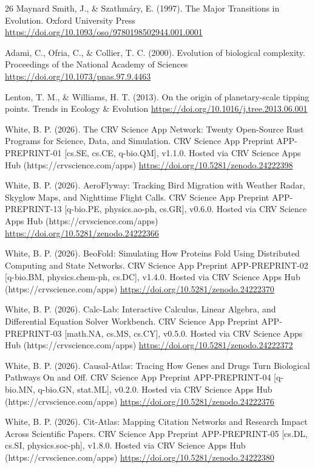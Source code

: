 \documentclass[10pt,letterpaper]{article}
\begin{document}
\begin{thebibliography}{26}
 Maynard Smith, J., \& Szathmáry, E. (1997). The Major Transitions in Evolution. Oxford University Press \url{https://doi.org/10.1093/oso/9780198502944.001.0001}

 Adami, C., Ofria, C., \& Collier, T. C. (2000). Evolution of biological complexity. Proceedings of the National Academy of Sciences \url{https://doi.org/10.1073/pnas.97.9.4463}

 Lenton, T. M., \& Williams, H. T. (2013). On the origin of planetary-scale tipping points. Trends in Ecology \& Evolution \url{https://doi.org/10.1016/j.tree.2013.06.001}

 White, B. P. (2026). The CRV Science App Network: Twenty Open-Source Rust Programs for Science, Data, and Simulation. CRV Science App Preprint APP-PREPRINT-01 [cs.SE, cs.CE, q-bio.QM], v1.1.0. Hosted via CRV Science Apps Hub (https://crvscience.com/apps) \url{https://doi.org/10.5281/zenodo.24222398}

 White, B. P. (2026). AeroFlyway: Tracking Bird Migration with Weather Radar, Skyglow Maps, and Nighttime Flight Calls. CRV Science App Preprint APP-PREPRINT-13 [q-bio.PE, physics.ao-ph, cs.GR], v0.6.0. Hosted via CRV Science Apps Hub (https://crvscience.com/apps) \url{https://doi.org/10.5281/zenodo.24222366}

 White, B. P. (2026). BeoFold: Simulating How Proteins Fold Using Distributed Computing and State Networks. CRV Science App Preprint APP-PREPRINT-02 [q-bio.BM, physics.chem-ph, cs.DC], v1.4.0. Hosted via CRV Science Apps Hub (https://crvscience.com/apps) \url{https://doi.org/10.5281/zenodo.24222370}

 White, B. P. (2026). Calc-Lab: Interactive Calculus, Linear Algebra, and Differential Equation Solver Workbench. CRV Science App Preprint APP-PREPRINT-03 [math.NA, cs.MS, cs.CY], v0.5.0. Hosted via CRV Science Apps Hub (https://crvscience.com/apps) \url{https://doi.org/10.5281/zenodo.24222372}

 White, B. P. (2026). Causal-Atlas: Tracing How Genes and Drugs Turn Biological Pathways On and Off. CRV Science App Preprint APP-PREPRINT-04 [q-bio.MN, q-bio.GN, stat.ML], v0.2.0. Hosted via CRV Science Apps Hub (https://crvscience.com/apps) \url{https://doi.org/10.5281/zenodo.24222376}

 White, B. P. (2026). Cit-Atlas: Mapping Citation Networks and Research Impact Across Scientific Papers. CRV Science App Preprint APP-PREPRINT-05 [cs.DL, cs.SI, physics.soc-ph], v1.8.0. Hosted via CRV Science Apps Hub (https://crvscience.com/apps) \url{https://doi.org/10.5281/zenodo.24222380}


\end{thebibliography}
\end{document}
